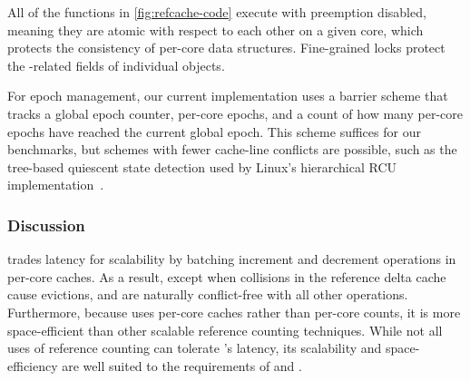 All of the functions in \cref{fig:refcache-code} execute with
preemption disabled, meaning they are atomic with respect to each
other on a given core, which protects the consistency of per-core data
structures.  Fine-grained locks protect the -related fields
of individual objects.

For epoch management, our current implementation uses a barrier scheme
that tracks a global epoch counter, per-core epochs, and a count of
how many per-core epochs have reached the current global epoch.  This
scheme suffices for our benchmarks, but schemes with fewer cache-line
conflicts are
possible, such as the tree-based quiescent state detection used
by Linux's hierarchical RCU implementation~\cite{lwn:treercu}.

\subsubsection{Discussion}
 trades latency for scalability by batching increment and
decrement operations in per-core caches.  As a result, except when
collisions in the reference delta cache cause evictions, 
and  are naturally conflict-free with all other operations.
%
Furthermore, because  uses per-core caches
rather than per-core counts, it is more space-efficient than other
scalable reference counting techniques.  While not all uses of
reference counting can tolerate 's latency, its scalability
and space-efficiency are well suited to the requirements of \vm and
\fs.

